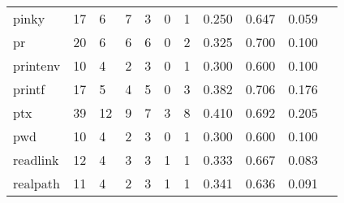 \begin{longtable}{lp{1.10cm}p{1.10cm}p{1.10cm}p{1.10cm}p{1.10cm}p{1.10cm}p{1.10cm}p{1.10cm}p{1.10cm}p{1.10cm}}
pinky     &                     17 &                                  6 &                                 7 &                                3 &                                 0 &                               1 &                          0.250 &                                 0.647 &                               0.059 \\
pr        &                     20 &                                  6 &                                 6 &                                6 &                                 0 &                               2 &                          0.325 &                                 0.700 &                               0.100 \\
printenv  &                     10 &                                  4 &                                 2 &                                3 &                                 0 &                               1 &                          0.300 &                                 0.600 &                               0.100 \\
printf    &                     17 &                                  5 &                                 4 &                                5 &                                 0 &                               3 &                          0.382 &                                 0.706 &                               0.176 \\
ptx       &                     39 &                                 12 &                                 9 &                                7 &                                 3 &                               8 &                          0.410 &                                 0.692 &                               0.205 \\
pwd       &                     10 &                                  4 &                                 2 &                                3 &                                 0 &                               1 &                          0.300 &                                 0.600 &                               0.100 \\
readlink  &                     12 &                                  4 &                                 3 &                                3 &                                 1 &                               1 &                          0.333 &                                 0.667 &                               0.083 \\
realpath  &                     11 &                                  4 &                                 2 &                                3 &                                 1 &                               1 &                          0.341 &                                 0.636 &                               0.091 \\

\end{longtable}
